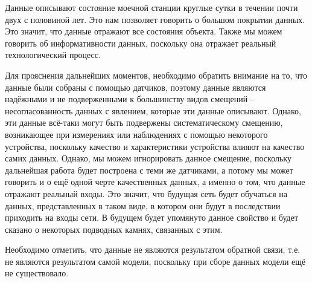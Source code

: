 {  \par \redline Данные описывают состояние моечной станции круглые сутки в течении почти двух с половиной лет. Это нам позволяет говорить о большом покрытии данных. Это значит, что данные отражают все состояния объекта. Также мы можем говорить об информативности данных, поскольку она отражает реальный технологический процесс.
  
  \par \redline Для прояснения дальнейших моментов, необходимо обратить внимание на то, что данные были собраны с помощью датчиков, поэтому данные являются надёжными и не подверженными к большинству видов смещений – несогласованность данных с явлением, которые эти данные описывают.  Однако, эти данные всё-таки могут быть подвержены систематическому смещению, возникающее при измерениях или наблюдениях с помощью некоторого устройства, поскольку качество и характеристики устройства влияют на качество самих данных. Однако, мы можем игнорировать данное смещение, поскольку дальнейшая работа будет построена с теми же датчиками, а потому мы может говорить и о ещё одной черте качественных данных, а именно о том, что данные отражают реальный входы. Это значит, что будущая сеть будет обучаться на данных, представленных в таком виде, в котором они будут в последствии приходить на входы сети. В будущем будет упомянуто данное свойство и будет сказано о некоторых подводных камнях, связанных с этим.
  
  \par \redline Необходимо отметить, что данные не являются результатом обратной связи, т.е. не являются результатом самой модели, поскольку при сборе данных модели ещё не существовало.
  
  \par \redline
  
}
